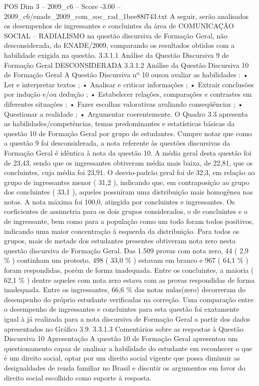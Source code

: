 \begin{textsample}{POS Dim 3 – 2009\_c6 – Score -3.00 – 2009\_c6/enade\_2009\_com\_soc\_rad\_1bee88f743.txt}
A seguir, serão analisados os desempenhos de ingressantes e concluintes da área de COMUNICAÇÃO SOCIAL – RADIALISMO na questão discursiva de Formação Geral, não desconsiderada, do ENADE/2009, comparando os resultados obtidos com a habilidade exigida na questão. 3.3.1.1 Análise da Questão Discursiva 9 de Formação Geral DESCONSIDERADA 3.3.1.2 Análise da Questão Discursiva 10 de Formação Geral A Questão Discursiva nº 10 ousou avaliar as habilidades : • Ler e interpretar textos ; • Analisar e criticar informações ; • Extrair conclusões por indução e/ou dedução ; • Estabelecer relações, comparações e contrastes em diferentes situações ; • Fazer escolhas valorativas avaliando conseqüências ; • Questionar a realidade ; • Argumentar coerentemente.
O Quadro 3.3 apresenta as habilidades/competências, temas predominantes e estatísticas básicas da questão 10 de Formação Geral por grupo de estudantes.
Cumpre notar que como a questão 9 foi desconsiderada, a nota referente às questões discursivas da Formação Geral é idêntica à nota da questão 10.
A média geral desta questão foi de 23,43, sendo que os ingressantes obtiveram média mais baixa, de 22,81, que os concluintes, cuja média foi 23,91.
O desvio-padrão geral foi de 32,3, em relação ao grupo de ingressantes menor ( 31,2 ), indicando que, em contraposição ao grupo dos concluintes ( 33,1 ), aqueles possuíram uma distribuição mais homogênea nas notas.
A nota máxima foi 100,0, atingida por concluintes e ingressantes.
Os coeficientes de assimetria para os dois grupos considerados, o de concluintes e o de ingressante, bem como para a população como um todo foram todos positivos, indicando uma maior concentração à esquerda da distribuição.
Para todos os grupos, mais de metade dos estudantes presentes obtiveram nota zero nesta questão discursiva de Formação Geral.
Das 1.509 provas com nota zero, 44 ( 2,9 \% ) continham um protesto, 498 ( 33,0 \% ) estavam em branco e 967 ( 64,1 \% ) foram respondidas, porém de forma inadequada.
Entre os concluintes, a maioria ( 62,1 \% ) dentre aqueles com nota zero estava com as provas respondidas de forma inadequada.
Entre os ingressantes, 66,6 \% das notas nulas(zero) decorreram do desempenho do próprio estudante verificadas na correção.
Uma comparação entre o desempenho de ingressantes e concluintes para esta questão foi exatamente igual à já realizada para a nota discursiva de Formação Geral a partir dos dados apresentados no Gráfico 3.9. 3.3.1.3 Comentários sobre as respostas à Questão Discursiva 10 Apresentação A questão 10 de Formação Geral apresentou um questionamento capaz de analisar a habilidade do estudante em reconhecer o que é um direito social, optar por um direito social vigente que possa diminuir as desigualdades de renda familiar no Brasil e discutir os argumentos em favor do direito social escolhido como suporte à resposta.

\end{textsample}
